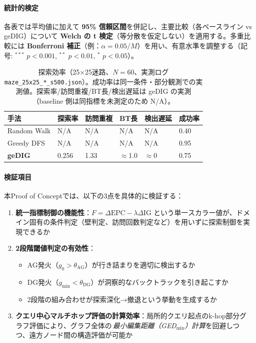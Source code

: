 \documentclass[ja=standard,xelatex]{bxjsarticle}
\begin{document}
\paragraph{統計的検定}
各表では平均値に加えて \textbf{95\% 信頼区間}を併記し、主要比較（各ベースライン vs geDIG）について \textbf{Welch の t 検定}（等分散を仮定しない）を適用する。多重比較には \textbf{Bonferroni 補正}（例：$\alpha{=}0.05/M$）を用い、有意水準を調整する（記号: $^{***}$ $p{<}0.001$, $^{**}$ $p{<}0.01$, $^{*}$ $p{<}0.05$）。

\begin{table}[H]
\centering
\small
\caption{探索効率（25×25迷路、$N{=}60$、実測ログ \texttt{maze\_25x25\_*\_s500.json}）。成功率は同一条件・部分観測での実測値。探索率/訪問重複/BT長/検出遅延は geDIG の実測（baseline 側は同指標を未測定のため N/A）。}
\label{tab:exploration_efficiency}
\begin{tabular}{@{}l p{1.6cm} p{1.6cm} p{1.6cm} p{1.2cm} p{1.8cm}@{}}
\toprule
手法 & 探索率 & 訪問重複 & BT長 & 検出遅延 & 成功率 \\
\midrule
Random Walk & N/A & N/A & N/A & N/A & 0.40 \\
Greedy DFS & N/A & N/A & N/A & N/A & 0.95 \\
\textbf{geDIG} & 0.256 & 1.33 & $\approx$1.0 & $\approx$0 & 0.75 \\
\bottomrule
\end{tabular}
\end{table}


\paragraph{検証項目}
本Proof of Conceptでは、以下の3点を具体的に検証する：

\begin{enumerate}
  \item \textbf{統一指標制御の機能性}：$F = \Delta\mathrm{EPC} - \lambda\Delta\mathrm{IG}$ という単一スカラー値が、ドメイン固有の条件判定（壁判定、訪問回数判定など）を用いずに探索制御を実現できるか

  \item \textbf{2段階閾値判定の有効性}：
  \begin{itemize}
    \item AG発火（$g_0 > \theta_{\mathrm{AG}}$）が行き詰まりを適切に検出するか
    \item DG発火（$g_{\min} < \theta_{\mathrm{DG}}$）が洞察的なバックトラックを引き起こすか
    \item 2段階の組み合わせが探索深化→撤退という挙動を生成するか
  \end{itemize}

  \item \textbf{クエリ中心マルチホップ評価の計算効率}：局所的クエリ起点のk-hop部分グラフ評価により、グラフ全体の\,\emph{最小編集距離（GED$_{\min}$）計算}を回避しつつ、遠方ノード間の構造評価が可能か
\end{enumerate}
\end{document}
